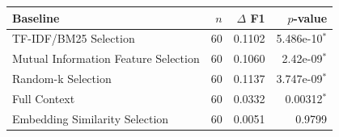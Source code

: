 \begin{tabular}{lrrr}
\toprule
Baseline & $n$ & $\Delta$ F1 & $p$-value \\
\midrule
TF-IDF/BM25 Selection & 60 & 0.1102 & 5.486e-10$^*$ \\
Mutual Information Feature Selection & 60 & 0.1060 & 2.42e-09$^*$ \\
Random-k Selection & 60 & 0.1137 & 3.747e-09$^*$ \\
Full Context & 60 & 0.0332 & 0.00312$^*$ \\
Embedding Similarity Selection & 60 & 0.0051 & 0.9799 \\
\bottomrule
\end{tabular}
